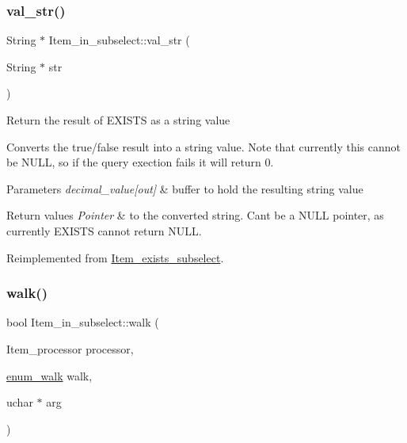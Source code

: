 \mbox{\label{classItem__in__subselect_a9db1ebc564af4086152ac6daf8809b40}} 
\subsubsection{\texorpdfstring{val\+\_\+str()}{val\_str()}}
{\footnotesize\ttfamily String $\ast$ Item\+\_\+in\+\_\+subselect\+::val\+\_\+str (\begin{DoxyParamCaption}\item[{String $\ast$}]{str }\end{DoxyParamCaption})\hspace{0.3cm}{\ttfamily [virtual]}}

Return the result of E\+X\+I\+S\+TS as a string value

Converts the true/false result into a string value. Note that currently this cannot be N\+U\+LL, so if the query exection fails it will return 0.


\begin{DoxyParams}{Parameters}
{\em decimal\+\_\+value\mbox{[}out\mbox{]}} & buffer to hold the resulting string value \\
\hline
\end{DoxyParams}

\begin{DoxyRetVals}{Return values}
{\em Pointer} & to the converted string. Can\textquotesingle{}t be a N\+U\+LL pointer, as currently E\+X\+I\+S\+TS cannot return N\+U\+LL. \\
\hline
\end{DoxyRetVals}


Reimplemented from \mbox{\hyperlink{classItem__exists__subselect_a008b448e0e9dab80098ece5e2ce18881}{Item\+\_\+exists\+\_\+subselect}}.

\mbox{\label{classItem__in__subselect_ae2d9db307c8214b314f387b8f0fca6ae}} 
\subsubsection{\texorpdfstring{walk()}{walk()}}
{\footnotesize\ttfamily bool Item\+\_\+in\+\_\+subselect\+::walk (\begin{DoxyParamCaption}\item[{Item\+\_\+processor}]{processor,  }\item[{\mbox{\hyperlink{classItem_a4e68f315ba2a26543339e9f0efed3695}{enum\+\_\+walk}}}]{walk,  }\item[{uchar $\ast$}]{arg }\end{DoxyParamCaption})\hspace{0.3cm}{\ttfamily [virtual]}}

